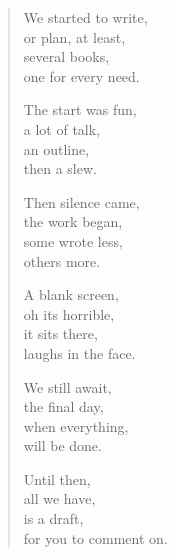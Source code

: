 {\begin{verse}
		\newpage
		{\normalsize {}}

		\bigskip
		We started to write, \\
		or plan, at least, \\
		several books, \\
		one for every need. \\
		\bigskip

		The start was fun, \\
		a lot of talk, \\
		an outline, \\
		then a slew. \\
		\bigskip

		Then silence came,\\
		the work began,\\
		some wrote less,\\
		others more. \\
		\bigskip

		A blank screen,\\
		oh its horrible,\\
		it sits there,\\
		laughs in the face. \\
		\bigskip

		We still await,\\
		the final day,\\
		when everything,\\
		will be done. \\
		\bigskip

		Until then,\\
		all we have,\\
		is a draft,\\
		for you to comment on.
	\end{verse}
	}
	 
